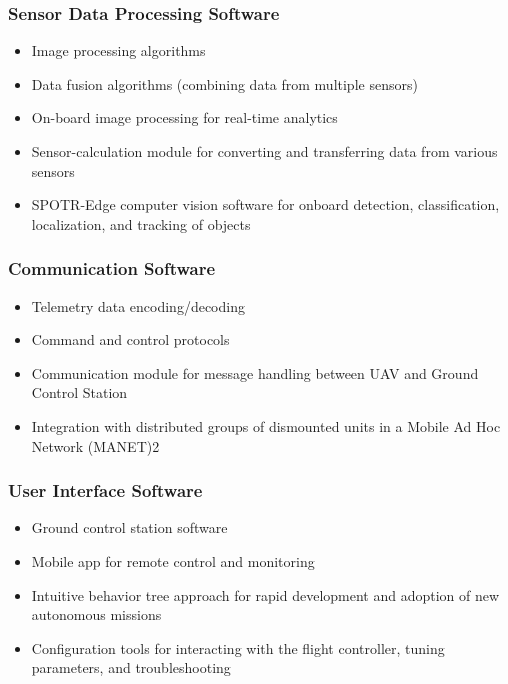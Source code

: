 \subsubsection{Sensor Data Processing Software}
\begin{itemize}
\item Image processing algorithms
\item Data fusion algorithms (combining data from multiple sensors)
\item On-board image processing for real-time analytics
\item Sensor-calculation module for converting and transferring data from various sensors
\item SPOTR-Edge computer vision software for onboard detection, classification, localization, and tracking of objects
\end{itemize}

\subsubsection{Communication Software}
\begin{itemize}
\item Telemetry data encoding/decoding
\item Command and control protocols
\item Communication module for message handling between UAV and Ground Control Station
\item Integration with distributed groups of dismounted units in a Mobile Ad Hoc Network (MANET)2
\end{itemize}

\subsubsection{User Interface Software}
\begin{itemize}
\item Ground control station software
\item Mobile app for remote control and monitoring
\item Intuitive behavior tree approach for rapid development and adoption of new autonomous missions
\item Configuration tools for interacting with the flight controller, tuning parameters, and troubleshooting
\end{itemize}